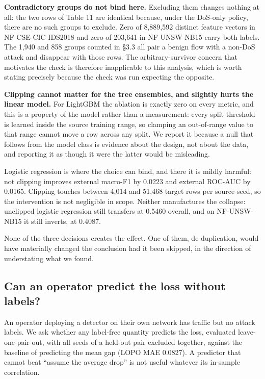 \documentclass[preprint,12pt]{elsarticle}
\begin{document}
\textbf{Contradictory groups do not bind here.} Excluding them changes nothing at all: the two rows of Table 11 are identical because, under the DoS-only policy, there are no such groups to exclude. Zero of 8,889,592 distinct feature vectors in NF-CSE-CIC-IDS2018 and zero of 203,641 in NF-UNSW-NB15 carry both labels. The 1,940 and 858 groups counted in \S{}3.3 all pair a benign flow with a non-DoS attack and disappear with those rows. The arbitrary-survivor concern that motivates the check is therefore inapplicable to this analysis, which is worth stating precisely because the check was run expecting the opposite.

\textbf{Clipping cannot matter for the tree ensembles, and slightly hurts the linear model.} For LightGBM the ablation is exactly zero on every metric, and this is a property of the model rather than a measurement: every split threshold is learned inside the source training range, so clamping an out-of-range value to that range cannot move a row across any split. We report it because a null that follows from the model class is evidence about the design, not about the data, and reporting it as though it were the latter would be misleading.

Logistic regression is where the choice can bind, and there it is mildly harmful: not clipping improves external macro-F1 by 0.0223 and external ROC-AUC by 0.0165. Clipping touches between 4,014 and 51,468 target rows per source-seed, so the intervention is not negligible in scope. Neither manufactures the collapse: unclipped logistic regression still transfers at 0.5460 overall, and on NF-UNSW-NB15 it still inverts, at 0.4087.

None of the three decisions creates the effect. One of them, de-duplication, would have materially changed the conclusion had it been skipped, in the direction of understating what we found.

\subsection{Can an operator predict the loss without labels?}

An operator deploying a detector on their own network has traffic but no attack labels. We ask whether any label-free quantity predicts the loss, evaluated leave-one-pair-out, with all seeds of a held-out pair excluded together, against the baseline of predicting the mean gap (LOPO MAE 0.0827). A predictor that cannot beat ``assume the average drop'' is not useful whatever its in-sample correlation.
\end{document}
